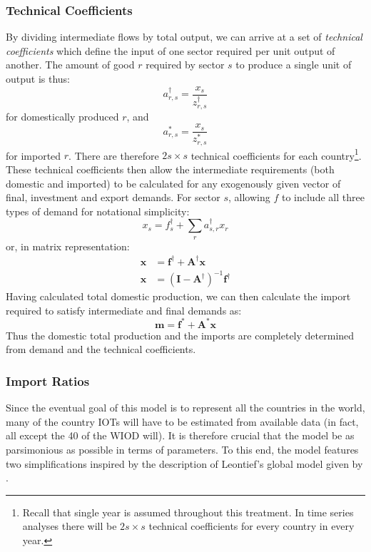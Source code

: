 \documentclass[a4paper]{article}
\begin{document}
\subsubsection*{Technical Coefficients}\label{sec:techcoeffs}
By dividing intermediate flows by total output, we can arrive at a set of \textit{technical coefficients} which define the input of one sector required per unit output of another.
The amount of good $r$ required by sector $s$ to produce a single unit of output is thus:
\begin{equation}\label{eq:adagger}
a_{r,s}^\dagger = \frac{x_s}{z^\dagger_{r,s}}
\end{equation}
for domestically produced $r$, and
\begin{equation}\label{eq:astar}
a_{r,s}^* = \frac{x_s}{z^*_{r,s}}
\end{equation}
for imported $r$. There are therefore $2s \times s$ technical coefficients for each country\footnote{Recall that single year is assumed throughout this treatment.
In time series analyses there will be $2s \times s$ technical coefficients for every country in every year.}.
These technical coefficients then allow the intermediate requirements (both domestic and imported) to be calculated for any exogenously given vector of final, investment and export demands. For sector $s$, allowing $f$ to include all three types of demand for notational simplicity:
$$
x_s = f^\dagger_s + \sum_r{a^\dagger_{s,r}x_r}
$$
or, in matrix representation:
\begin{align}
\boldsymbol{x}& = \boldsymbol{f^\dagger} 
+ \boldsymbol{A^\dagger}\boldsymbol{x} \nonumber\\
\boldsymbol{x}& = (\boldsymbol{I} - \boldsymbol{A^\dagger})^{-1} 
\boldsymbol{f^\dagger}\label{eqn:xIRIO}
\end{align}
Having calculated total domestic production, we can then calculate the import required to satisfy intermediate and final demands as:
\begin{equation}\label{eqn:mIRIO}
\boldsymbol{m} = \boldsymbol{f^*} 
+ \boldsymbol{A^*}\boldsymbol{x}
\end{equation}
Thus the domestic total production and the imports are completely determined from demand and the technical coefficients.

\subsubsection*{Import Ratios}\label{sec:importratios}
Since the eventual goal of this model is to represent all the countries in the world, many of the country IOTs will have to be estimated from available data (in fact, all except the 40 of the WIOD will).
It is therefore crucial that the model be as parsimonious as possible in terms of parameters.
To this end, the model features two simplifications inspired by the description of Leontief's global model given by \textcite{Duchin2004}.
\end{document}
